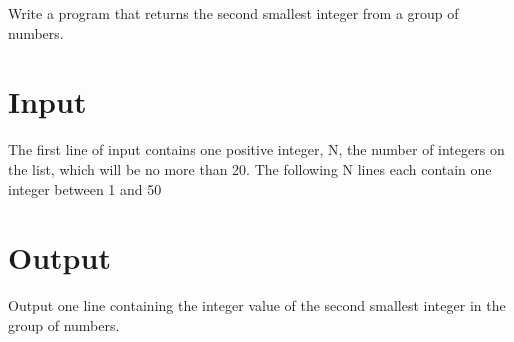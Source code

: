 
Write a program that returns the second smallest integer from a group of numbers.

\section*{Input}

The first line of input contains one positive integer, N, the number of integers on the list, which will be no more than 20. The following N lines each contain one integer between 1 and 50

\section*{Output}

Output one line containing the integer value of the second smallest integer in the group of numbers.
